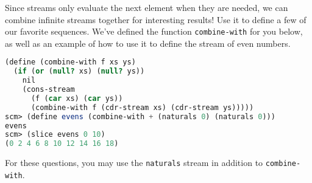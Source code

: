 \question Since streams only evaluate the next element when they are needed, we
can combine infinite streams together for interesting results! Use it to define
a few of our favorite sequences. We've defined the function
\texttt{combine-with} for you below, as well as an example of how to use it to
define the stream of even numbers.

\begin{lstlisting}[language=Scheme]
(define (combine-with f xs ys)
  (if (or (null? xs) (null? ys))
    nil
    (cons-stream
      (f (car xs) (car ys))
      (combine-with f (cdr-stream xs) (cdr-stream ys)))))
scm> (define evens (combine-with + (naturals 0) (naturals 0)))
evens
scm> (slice evens 0 10)
(0 2 4 6 8 10 12 14 16 18)
\end{lstlisting}
For these questions, you may use the \texttt{naturals} stream in addition to
\texttt{combine-with}.

